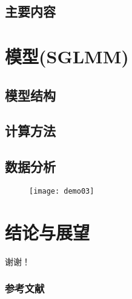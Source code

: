 \documentclass[11pt,compress,xcolor=x11names,UTF8]{beamer}
\begin{document}
\subsection{主要内容}


\section{模型(SGLMM)}

\subsection{模型结构}

\subsection{计算方法}

\subsection{数据分析}

\begin{frame}
\begin{figure}
\centering
\texttt{[image: demo03]}
\end{figure}
\end{frame}

\section{结论与展望}



\begin{frame}

  \centerline{\Huge\color{red} 谢谢！ }

\end{frame}



\begin{frame}[allowframebreaks]
\frametitle{参考文献}


\end{frame}
\end{document}
